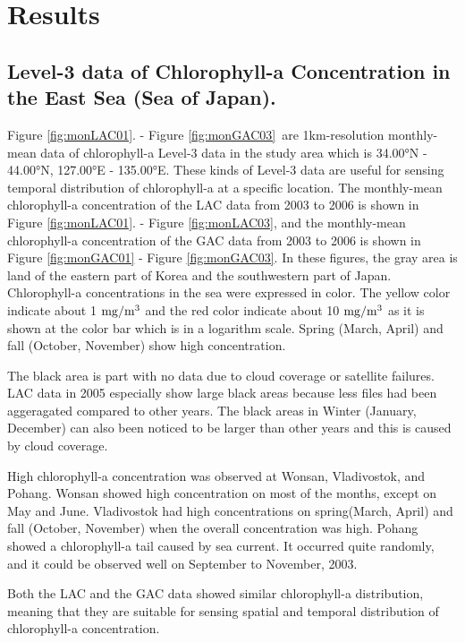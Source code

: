 \section{Results}

\subsection{Level-3 data of Chlorophyll-a Concentration in the East Sea (Sea of Japan).}

Figure \ref{fig:monLAC01}. - Figure \ref{fig:monGAC03}\ are 1km-resolution monthly-mean data of chlorophyll-a Level-3 data in the study area which is 34.00°N - 44.00°N, 127.00°E - 135.00°E. These kinds of Level-3 data are useful for sensing temporal distribution of chlorophyll-a at a specific location. The monthly-mean chlorophyll-a concentration of the LAC data from 2003 to 2006 is shown in Figure \ref{fig:monLAC01}. - Figure \ref{fig:monLAC03}, and the monthly-mean chlorophyll-a concentration of the GAC data from 2003 to 2006 is shown in Figure \ref{fig:monGAC01} - Figure \ref{fig:monGAC03}.
In these figures, the gray area is land of the eastern part of Korea and the southwestern part of Japan. Chlorophyll-a concentrations in the sea were expressed in color. The yellow color indicate about 1 ${\rm mg/m^3}$ and the red color indicate about 10 ${\rm mg/m^3}$ as it is shown at the color bar which is in a logarithm scale. Spring (March, April) and fall (October, November) show high concentration. 

The black area is part with no data due to cloud coverage or satellite failures. LAC data in 2005 especially show large black areas because less files had been aggeragated compared to other years. The black areas in Winter (January, December) can also been noticed to be larger than other years and this is caused by cloud coverage.

High chlorophyll-a concentration was observed at Wonsan, Vladivostok, and Pohang. Wonsan showed high concentration on most of the months, except on May and June. Vladivostok had high concentrations on spring(March, April) and fall (October, November) when the overall concentration was high. Pohang showed a chlorophyll-a tail caused by sea current. It occurred quite randomly, and it could be observed well on September to November, 2003. 

Both the LAC and the GAC data showed similar chlorophyll-a distribution, meaning that they are suitable for sensing spatial and temporal distribution of chlorophyll-a concentration.

